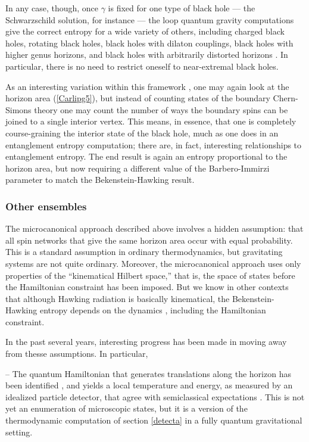 \documentclass[12pt]{article}
\begin{document}
In any case, though, once $\gamma$ is fixed for one type of black
hole --- the Schwarzschild solution, for instance --- the loop 
quantum gravity computations give the correct entropy for a wide 
variety of others, including charged black holes, rotating black holes, 
black holes with dilaton couplings, black holes with higher genus 
horizons, and black holes with arbitrarily distorted horizons 
\cite{AshtekarLew,Engle}.  In particular, there is no need 
to restrict oneself to near-extremal black holes.  

As an interesting variation within this framework \cite{Livine}, 
one may again look at the horizon area (\ref{Carlipg5}), but instead 
of counting states of the boundary Chern-Simons theory one may 
count the number of ways the boundary spins can 
be joined to a single interior vertex.  This means, in essence, that 
one is completely course-graining the interior state of the black
hole, much as one does in an entanglement entropy computation; 
there are, in fact, interesting relationships to entanglement
entropy.  The end result is again an entropy proportional to 
the horizon area, but now requiring a different value of the 
Barbero-Immirzi parameter to match the Bekenstein-Hawking 
result.

\subsubsection{Other ensembles}

The microcanonical approach described above involves a hidden
assumption: that all spin networks that give the same horizon area
occur with equal probability.  This is a standard assumption in
ordinary thermodynamics, but gravitating systems are not quite
ordinary.  Moreover, the microcanonical approach uses only
properties of the ``kinematical Hilbert space,''  that is, the space
of states before the Hamiltonian constraint has been imposed.
But we know in other contexts that although Hawking radiation is
basically kinematical, the Bekenstein-Hawking entropy depends
on the dynamics \cite{Visser_essential}, including the Hamiltonian 
constraint.

In the past several years, interesting progress has been made in
moving away from thesse assumptions.  In particular,

-- The quantum Hamiltonian that generates translations along the
horizon has been identified \cite{Bianchi}, and yields 
a local temperature and energy, as measured by an idealized
particle detector, that agree with semiclassical expectations \cite{Frodden}.  
This is not yet an enumeration of microscopic states, but it is a version
of the thermodynamic computation of section \ref{detecta} in a
fully quantum gravitational setting.
\end{document}
